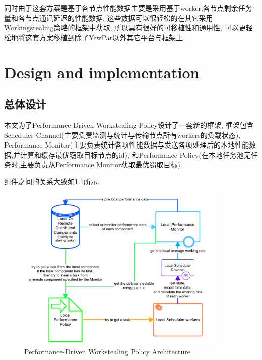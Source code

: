 \documentclass{mproj}
\begin{document}
同时由于这套方案是基于各节点性能数据主要是采用基于worker,各节点剩余任务量和各节点通讯延迟的性能数据,
这些数据可以很轻松的在其它采用Workingstealing策略的框架中获取,
所以具有很好的可移植性和通用性,
可以更轻松地将这套方案移植到除了YewPar以外其它平台与框架上.

\chapter{Design and implementation}\label{design}

\section{总体设计}

本文为了Performance-Driven Workstealing Policy设计了一套新的框架,
框架包含Scheduler Channel(主要负责监测与统计与传输节点所有workers的负载状态),
Performance Monitor(主要负责统计各项性能数据与发送各项处理后的本地性能数据,并计算和缓存最优窃取目标节点的id),
和Performance Policy(在本地任务池无任务时,主要负责从Performance Monitor获取最优窃取目标).

组件之间的关系大致如\cref{fig:overall_architecture}所示.
\begin{figure}[h] %
    \centering %
    \includegraphics[width=0.9\textwidth]{images/overall_architecture.pdf} %
    \caption{Performance-Driven Workstealing Policy Architecture} %
    \label{fig:overall_architecture} %
\end{figure}
\FloatBarrier
\end{document}
